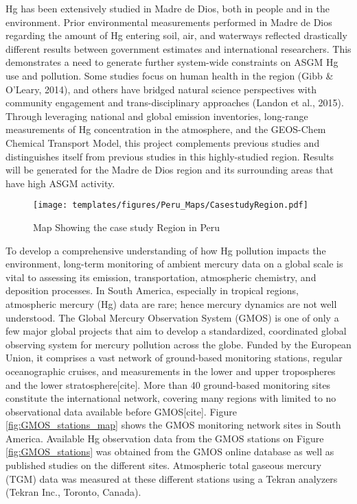 \begin{flushleft}
Hg has been extensively studied in Madre de Dios, both in people and in the environment. Prior environmental measurements performed in Madre de Dios regarding the amount of Hg entering soil, air, and waterways reflected drastically different results between government estimates and international researchers. This demonstrates a need to generate further system-wide constraints on ASGM Hg use and pollution. Some studies focus on human health in the region (Gibb \& O'Leary, 2014), and others have bridged natural science perspectives with community engagement and trans-disciplinary approaches (Landon et al., 2015). Through leveraging national and global emission inventories, long-range measurements of Hg concentration in the atmosphere, and the GEOS-Chem Chemical Transport Model, this project complements previous studies and distinguishes itself from previous studies in this highly-studied region. Results will be generated for the Madre de Dios region and its surrounding areas that have high ASGM activity. 
\end{flushleft}
\begin{figure}[H]
  \texttt{[image: templates/figures/Peru\_Maps/CasestudyRegion.pdf]}
  \centering
  \caption{Map Showing the case study Region in Peru}
  \label{fig:PeruCS}
\end{figure}
\FloatBarrier

\begin{flushleft}
To develop a comprehensive understanding of how Hg pollution impacts the environment, long-term monitoring of ambient mercury data on a global scale is vital to assessing its emission, transportation, atmospheric chemistry, and deposition processes. In South America, especially in tropical regions, atmospheric mercury (Hg) data are rare; hence mercury dynamics are not well understood. The Global Mercury Observation System (GMOS) is one of only a few major global projects that aim to develop a standardized, coordinated global observing system for mercury pollution across the globe. Funded by the European Union, it comprises a vast network of ground-based monitoring stations, regular oceanographic cruises, and measurements in the lower and upper tropospheres and the lower stratosphere[cite]. More than 40 ground-based monitoring sites constitute the international network, covering many regions with limited to no observational data available before GMOS[cite]. Figure \ref{fig:GMOS_stations_map} shows the GMOS monitoring network sites in South America. Available Hg observation data from the GMOS stations on Figure \ref{fig:GMOS_stations} was obtained from the GMOS online database as well as published studies on the different sites. Atmospheric total gaseous mercury (TGM) data was  measured at these different stations using a Tekran analyzers (Tekran Inc., Toronto, Canada). 
\end{flushleft}


